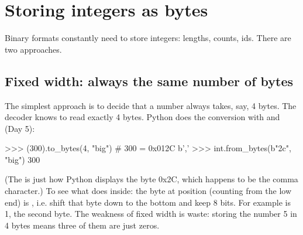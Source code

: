 \documentclass[10pt,a4paper]{article}
\begin{document}
\section{Storing integers as bytes}
Binary formats constantly need to store integers: lengths, counts, ids. There are two approaches.
\subsection{Fixed width: always the same number of bytes}
The simplest approach is to decide that a number always takes, say, 4 bytes. The decoder knows to read exactly 4 bytes. Python does the conversion with  and  (Day 5):
\begin{txtcode}
>>> (300).to_bytes(4, "big")       # 300 = 0x012C
b','
>>> int.from_bytes(b"\x2c", "big")
300
\end{txtcode}
(The \code{,\allowbreak{}} is just how Python displays the byte 0x2C, which happens to be the comma character.)
To see what  does inside: the byte at position  (counting from the low end) is , i.e. shift that byte down to the bottom and keep 8 bits. For example  is 1, the second byte.
The weakness of fixed width is waste: storing the number 5 in 4 bytes means three of them are just zeros.
\end{document}
